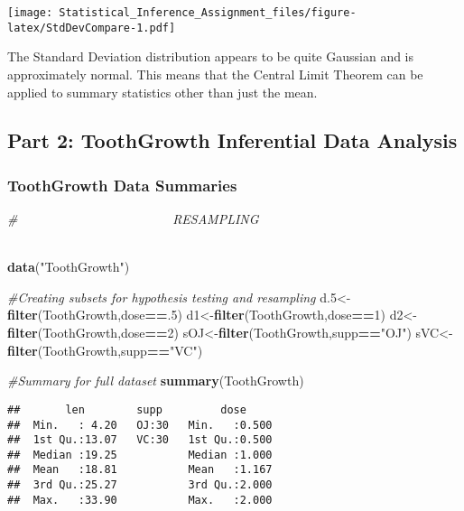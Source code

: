 \documentclass[]{article}
\newenvironment{Shaded}{\begin{snugshade}}{\end{snugshade}}
\newcommand{\KeywordTok}[1]{\textcolor[rgb]{0.13,0.29,0.53}{\textbf{#1}}}
\newcommand{\DecValTok}[1]{\textcolor[rgb]{0.00,0.00,0.81}{#1}}
\newcommand{\StringTok}[1]{\textcolor[rgb]{0.31,0.60,0.02}{#1}}
\newcommand{\CommentTok}[1]{\textcolor[rgb]{0.56,0.35,0.01}{\textit{#1}}}
\newcommand{\OperatorTok}[1]{\textcolor[rgb]{0.81,0.36,0.00}{\textbf{#1}}}
\newcommand{\NormalTok}[1]{#1}
\begin{document}
\texttt{[image: Statistical\_Inference\_Assignment\_files/figure-latex/StdDevCompare-1.pdf]}

The Standard Deviation distribution appears to be quite Gaussian and is
approximately normal. This means that the Central Limit Theorem can be
applied to summary statistics other than just the mean.

\subsection{Part 2: ToothGrowth Inferential Data
Analysis}\label{part-2-toothgrowth-inferential-data-analysis}

\subsubsection{ToothGrowth Data
Summaries}\label{toothgrowth-data-summaries}

\begin{Shaded}
\begin{Highlighting}[]
\CommentTok{#~~~~~~~~~~~~~~~~~~~~~~~~RESAMPLING~~~~~~~~~~~~~~~~~~~~~~~~~~~~~~~~~~~~~~~~~~~~~~~~}

\KeywordTok{data}\NormalTok{(}\StringTok{"ToothGrowth"}\NormalTok{)}

\CommentTok{#Creating subsets for hypothesis testing and resampling}
\NormalTok{d.}\DecValTok{5}\NormalTok{<-}\KeywordTok{filter}\NormalTok{(ToothGrowth,dose}\OperatorTok{==}\NormalTok{.}\DecValTok{5}\NormalTok{)}
\NormalTok{d1<-}\KeywordTok{filter}\NormalTok{(ToothGrowth,dose}\OperatorTok{==}\DecValTok{1}\NormalTok{)}
\NormalTok{d2<-}\KeywordTok{filter}\NormalTok{(ToothGrowth,dose}\OperatorTok{==}\DecValTok{2}\NormalTok{)}
\NormalTok{sOJ<-}\KeywordTok{filter}\NormalTok{(ToothGrowth,supp}\OperatorTok{==}\StringTok{"OJ"}\NormalTok{)}
\NormalTok{sVC<-}\KeywordTok{filter}\NormalTok{(ToothGrowth,supp}\OperatorTok{==}\StringTok{"VC"}\NormalTok{)}

\CommentTok{#Summary for full dataset}
\KeywordTok{summary}\NormalTok{(ToothGrowth)}
\end{Highlighting}
\end{Shaded}

\begin{verbatim}
##       len        supp         dose      
##  Min.   : 4.20   OJ:30   Min.   :0.500  
##  1st Qu.:13.07   VC:30   1st Qu.:0.500  
##  Median :19.25           Median :1.000  
##  Mean   :18.81           Mean   :1.167  
##  3rd Qu.:25.27           3rd Qu.:2.000  
##  Max.   :33.90           Max.   :2.000
\end{verbatim}
\end{document}
